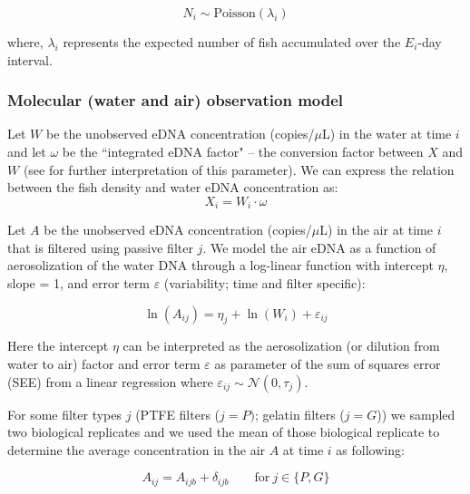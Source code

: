 \documentclass{article}
\begin{document}
\begin{equation}
N_i \sim \mathrm{Poisson}(\lambda_i)
\end{equation}

where, $\lambda_i$ represents the expected number of fish accumulated over the $E_i$-day interval.

\subsubsection{Molecular (water and air) observation model}
Let $W$ be the unobserved eDNA concentration (copies/$\mu$L) in the water at time $i$ and let $\omega$ be the ``integrated eDNA factor" -- the conversion factor between $X$ and $W$ (see \cite{guri2024a} for further interpretation of this parameter). We can express the relation between the fish density and water eDNA concentration as:
\begin{equation}
X_{i} = W_{i} \cdot \omega
\end{equation}

Let $A$ be the unobserved eDNA concentration (copies/$\mu$L) in the air at time $i$ that is filtered using passive filter $j$. We model the air eDNA as a function of aerosolization of the water DNA through a log-linear function with intercept $\eta$, slope = 1, and error term $\varepsilon$ (variability; time and filter specific):

\begin{equation}
\ln(A_{ij}) = \eta_{j} + \ln(W_{i}) + \varepsilon_{ij}
\end{equation}

Here the intercept $\eta$ can be interpreted as the aerosolization (or dilution from water to air) factor and error term $\varepsilon$ as parameter of the sum of squares error (SEE) from a linear regression where $\varepsilon_{ij} \sim \mathcal{N}(0,\tau_j)$.

For some filter types $j$ (PTFE filters (${j=P})$; gelatin filters (${j=G}$)) we sampled two biological replicates and we used the mean of those biological replicate to determine the average concentration in the air $A$ at time $i$ as following:

\begin{equation}
A_{ij} = A_{ijb} + \delta_{ijb} \qquad \text{for} \ j \in \{P,G\}
\end{equation}

\end{document}
